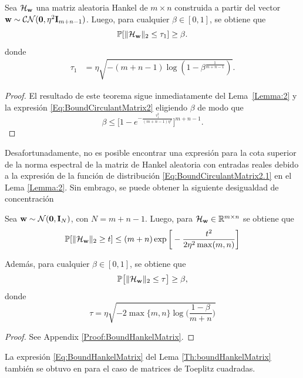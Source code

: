 	\begin{theorem}\label{Th:boundHankelMatrix2}
		Sea $\mathcal{H}_{\mathbf{w}}$ una matriz aleatoria Hankel de $m\times n$ construida a partir del vector $\mathbf{w} \sim\mathcal{CN}(\mathbf{0},\eta^2\mathbf{I}_{m+n-1})$. Luego, para cualquier $\beta\in [0,1]$, se obtiene que
		\[ \mathbb{P}[\|\mathcal{H}_{\mathbf{w}}\|_2\le \tau_1]\ge\beta.
		\]
		donde 
		\begin{equation}
			\begin{aligned} 
				\tau_1 & =  \eta\sqrt{-(m+n-1)\log(1-\beta^{\frac{1}{m+n-1}})}. 
			\end{aligned}
			\label{Eq:BoundHankelMatrix2}
		\end{equation}
	\end{theorem}				
	\begin{proof}
		El resultado de este teorema sigue inmediatamente del Lema~\ref{Lemma:2} y la expresión \eqref{Eq:BoundCirculantMatrix2} eligiendo $\beta$ de modo que
		\[\beta \leq \bigg[1-e^{-\frac{\tau_1^2}{(m+n-1)\eta^2}}\bigg]^{m+n-1}. \]
	\end{proof}
	
	Desafortunadamente, no es posible encontrar una expresión para la cota superior de la norma espectral de la matriz de Hankel aleatoria con entradas reales debido a la expresión de la función de distribución \eqref{Eq:BoundCirculantMatrix2.1} en el Lema \eqref{Lemma:2}. Sin embrago, se puede obtener la siguiente desigualdad de concentración 
	
	
	\begin{lemma}\label{Th:boundHankelMatrix}
		Sea $\mathbf{w}\sim\mathcal{N}(\mathbf{0},\mathbf{I}_{N})$, con $N = m+n-1$. Luego, para  $\mathcal{H}_{\mathbf{w}}\in\mathbb{R}^{m\times n}$ se obtiene que 
		\begin{equation}
			\mathbb{P}[\|\mathcal{H}_{\mathbf{w}}\|_2\geq t] \leq (m+n) \exp\bigg[-\frac{t^2}{2\eta^2\max(m,n)}\bigg]
			\label{Eq:BoundHankelMatrix}
		\end{equation}
	
	Además, para cualquier $\beta\in[0,1]$, se obtiene que
	\[\mathbb{P}\big[\|\mathcal{H}_{\mathbf{w}}\|_2\le\tau\big]\ge \beta,\]
	donde 
	\begin{equation}
		\tau = \eta\sqrt{-2\max\{m,n\}\log\bigg(\frac{1-\beta}{m+n}\bigg)}
		\label{Eq:BoundHankelMatrix1}
	\end{equation}
	\end{lemma}				
	\begin{proof}
		See Appendix \ref{Proof:BoundHankelMatrix}.
	\end{proof}

	La expresión \eqref{Eq:BoundHankelMatrix} del Lema \eqref{Th:boundHankelMatrix} también se obtuvo en \cite{Qiao2020} para el caso de matrices de Toeplitz cuadradas. 
	
